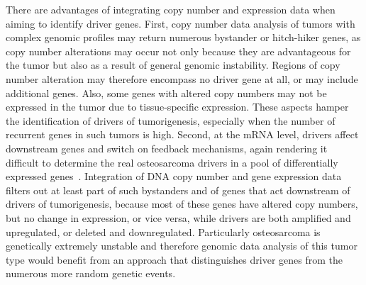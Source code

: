 There are advantages of integrating copy number
and expression data when aiming to identify
driver genes. First, copy number data analysis of
tumors with complex genomic profiles may return
numerous bystander or hitch\hyp{}hiker genes, as copy
number alterations may occur not only because
they are advantageous for the tumor but also as a
result of general genomic instability. Regions of
copy number alteration may therefore encompass
no driver gene at all, or may include additional
genes. Also, some genes with altered copy numbers
may not be expressed in the tumor due to
tissue\hyp{}specific expression. These aspects hamper
the identification of drivers of tumorigenesis,
especially when the number of recurrent genes in
such tumors is high. Second, at the mRNA level,
drivers affect downstream genes and switch on
feedback mechanisms, again rendering it difficult
to determine the real osteosarcoma drivers in a
pool of differentially expressed genes~\cite{lee2008integrative}. Integration of DNA copy number and
gene expression data filters out at least part of
such bystanders and of genes that act downstream
of drivers of tumorigenesis, because most
of these genes have altered copy numbers, but no
change in expression, or vice versa, while drivers
are both amplified and upregulated, or deleted
and downregulated. Particularly osteosarcoma is
genetically extremely unstable and therefore
genomic data analysis of this tumor type would
benefit from an approach that distinguishes driver
genes from the numerous more random genetic
events.

